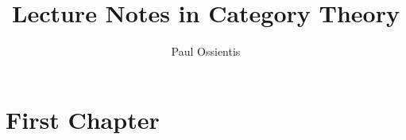 \documentclass{report}
\title{Lecture Notes in Category Theory}
\author{Paul Ossientis}
\begin{document}
\maketitle
\tableofcontents
\newpage
\chapter{First Chapter}
    
\printindex

\end{document}
